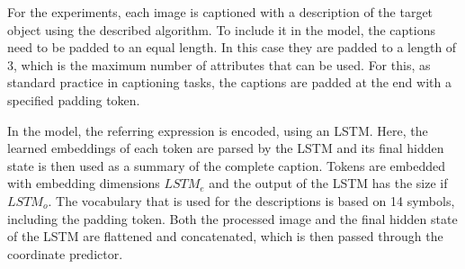 
For the experiments, each image is captioned with a description of the target object using the described algorithm.
To include it in the model, the captions need to be padded to an equal length.
In this case they are padded to a length of 3, which is the maximum number of attributes that can be used.
For this, as standard practice in captioning tasks, the captions are padded at the end with a specified padding token.

In the model, the referring expression is encoded, using an LSTM.
Here, the learned embeddings of each token are parsed by the LSTM and its final hidden state is then used as a summary of the complete caption.
Tokens are embedded with embedding dimensions $LSTM_e$ and the output of the LSTM has the size if $LSTM_o$.
The vocabulary that is used for the descriptions is based on 14 symbols, including the padding token.
Both the processed image and the final hidden state of the LSTM are flattened and concatenated, which is then passed through the coordinate predictor.

